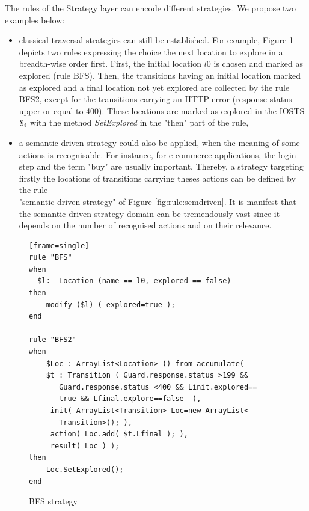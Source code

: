 The rules of the Strategy layer can encode different strategies.
We propose two examples below:
\begin{itemize}

\item classical traversal strategies can still be established.
For example, Figure \ref{fig:rule:bfs} depicts two rules
expressing the choice the next location to explore in a
breadth-wise order first. First, the initial location $l0$ is
chosen and marked as explored (rule BFS).  Then, the transitions
having an initial location marked as explored and a final
location not yet explored are collected by the rule BFS2, except
for the transitions carrying an HTTP error (response status upper
or equal to 400).  These locations are marked as explored in the
IOSTS $\EuScript{S}_i$ with the method \emph{SetExplored} in the
"then" part of the rule,

\item  a semantic-driven strategy could also be applied, when the
meaning of some actions is recognisable. For instance, for
e-commerce applications, the login step and the term "buy" are
usually important. Thereby, a strategy targeting firstly the
locations of transitions carrying theses actions can be defined
by the rule\\"semantic-driven strategy" of Figure
\ref{fig:rule:semdriven}.
It is manifest that the semantic-driven strategy domain can be
tremendously vast since it depends on the number of recognised
actions and on their relevance.
\end{itemize}

\begin{figure}[ht]
\begin{center}
\begin{scriptsize}
\begin{verbatim}[frame=single]
rule "BFS"
when
  $l:  Location (name == l0, explored == false)
then
    modify ($l) ( explored=true );
end

rule "BFS2"
when
    $Loc : ArrayList<Location> () from accumulate(
    $t : Transition ( Guard.response.status >199 &&
       Guard.response.status <400 && Linit.explored==
       true && Lfinal.explore==false  ),
     init( ArrayList<Transition> Loc=new ArrayList<
       Transition>(); ),
     action( Loc.add( $t.Lfinal ); ),
     result( Loc ) );
then
    Loc.SetExplored();
end
\end{verbatim}
\end{scriptsize}
\end{center}

\caption {BFS strategy} \label{fig:rule:bfs}
\end{figure}

